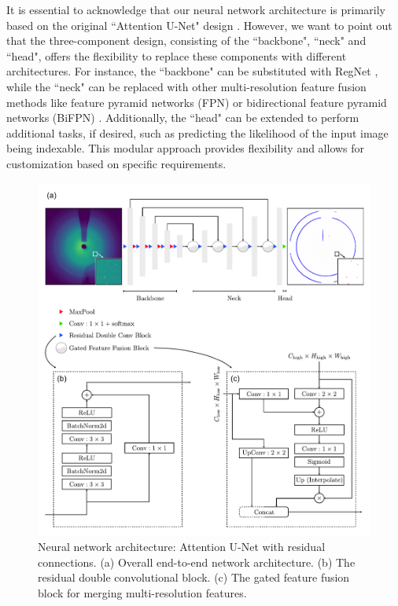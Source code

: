\documentclass[a4paper]{article}
\begin{document}
It is essential to acknowledge that our neural network architecture is primarily based on the original ``Attention U-Net" design \citep{oktayAttentionUNetLearning2018}.  However, we want to point out that the three-component design, consisting of the ``backbone", ``neck" and ``head", offers the flexibility to replace these components with different architectures.  For instance, the ``backbone" can be substituted with RegNet \citep{radosavovicDesigningNetworkDesign2020}, while the ``neck" can be replaced with other multi-resolution feature fusion methods like feature pyramid networks (FPN) \citep{linFeaturePyramidNetworks2017} or bidirectional feature pyramid networks (BiFPN) \citep{tanEfficientDetScalableEfficient2020}.  Additionally, the ``head" can be extended to perform additional tasks, if desired, such as predicting the likelihood of the input image being indexable.  This modular approach provides flexibility and allows for customization based on specific requirements.

\begin{figure}[!ht]
\includegraphics[width=\textwidth,keepaspectratio]
{./figures/network_arc.pdf}
\caption{Neural network architecture: Attention U-Net with residual connections.
(a) Overall end-to-end network architecture.  (b) The residual double
convolutional block.  (c) The gated feature fusion block for merging
multi-resolution features.}
\label{fig : network arc}
\end{figure}
\end{document}
